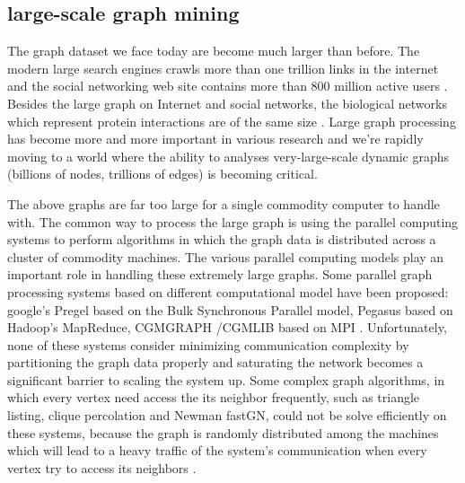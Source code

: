 \documentclass{acm_proc_article-sp}
\begin{document}
\subsection{large-scale graph mining}
The graph dataset we face today are become much larger than before. The modern large search engines crawls more than one trillion links in the internet and the social networking web site contains more than 800 million active users \cite{url:facebook}. Besides the large graph on Internet and social networks, the biological networks which represent protein interactions are of the same size \cite{bailly-bechet:finding}. Large graph processing has become more and more important in various research and we're rapidly moving to a world where the ability to analyses very-large-scale dynamic graphs (billions of nodes, trillions of edges) is becoming critical.
\par
The above graphs are far too large for a single commodity computer to handle with. The common way to process the large graph is using the parallel computing systems to perform algorithms in which the graph data is distributed across a cluster of commodity machines. The various parallel computing models play an important role in handling these extremely large graphs. Some parallel graph processing systems based on different computational model have been proposed: google's Pregel based on the Bulk Synchronous Parallel model, Pegasus based on Hadoop's MapReduce, CGMGRAPH /CGMLIB based on MPI \cite{kang:pegasus,malewicz:pregel,chan:cgmlib} . Unfortunately, none of these systems consider minimizing communication complexity by partitioning the graph data properly and saturating the network becomes a significant barrier to scaling the system up. Some complex graph algorithms, in which every vertex need access the its neighbor frequently, such as triangle listing, clique percolation and Newman fastGN, could not be solve efficiently on these systems, because the graph is randomly distributed among the machines which will lead to a heavy traffic of the system's communication when every vertex try to access its neighbors .
\end{document}
